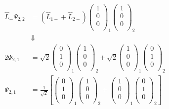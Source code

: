 \documentclass[11pt]{article}
\numberwithin{equation}{section}
\begin{document}
\begin{align*}
\hat{L}_{-}\Psi_{2,2} &= (\hat{L}_{1-}+\hat{L}_{2-})\left(\begin{array}{c} 1\\ 0\\ 0\\\end{array}\right)_{1}\left(\begin{array}{c} 1\\ 0\\ 0\\\end{array}\right)_{2} \\
&\Downarrow\\
2\Psi_{2,1} &= \sqrt{2}\left(\begin{array}{c} 0\\ 1\\ 0\\\end{array}\right)_{1}\left(\begin{array}{c} 1\\ 0\\ 0\\\end{array}\right)_{2} +
\sqrt{2}\left(\begin{array}{c} 1\\ 0\\ 0\\\end{array}\right)_{1}\left(\begin{array}{c} 0\\ 1\\ 0\\\end{array}\right)_{2} \\
\Psi_{2,1} &= \frac{1}{\sqrt{2}}\left[\left(\begin{array}{c} 0\\ 1\\ 0\\\end{array}\right)_{1}\left(\begin{array}{c} 1\\ 0\\ 0\\\end{array}\right)_{2} +
\left(\begin{array}{c} 1\\ 0\\ 0\\\end{array}\right)_{1}\left(\begin{array}{c} 0\\ 1\\ 0\\\end{array}\right)_{2}\right]
\end{align*}
\end{document}
